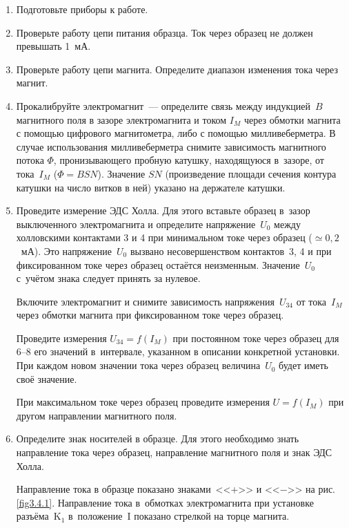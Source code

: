 \begin{enumerate}
\item{ Подготовьте приборы к работе.}

\item{ Проверьте работу цепи питания образца. Ток через образец не должен превышать 1~мА.}

\item{ Проверьте работу цепи магнита. Определите диапазон изменения тока через магнит.}

\item{ Прокалибруйте электромагнит~--- определите связь между индукцией~$B$ магнитного поля в зазоре электромагнита и током $I_M$ через обмотки магнита с помощью цифрового магнитометра, либо с помощью милливеберметра. В случае использования милливеберметра снимите зависимость магнитного потока $\Phi$, пронизывающего пробную катушку, находящуюся в~зазоре, от тока~$I_M$ ($\Phi=BSN$). Значение $SN$ (произведение площади сечения контура катушки на число витков в ней) указано на держателе катушки.}

\item{ Проведите измерение ЭДС Холла. Для этого вставьте образец в~зазор выключенного электромагнита и определите напряжение~$U_0$ между холловскими контактами 3 и 4 при минимальном токе через образец ($\simeq 0,2$~мА). Это напряжение~$U_0$ вызвано несовершенством контактов~3, 4 и при фиксированном токе через образец остаётся неизменным. Значение~$U_0$ с~учётом знака следует принять за нулевое.

Включите электромагнит и снимите зависимость напряжения~$U_{34}$ от тока~$I_M$ через обмотки магнита при фиксированном токе через образец.

Проведите измерения $U_{34}=f(I_{M})$ при постоянном токе через образец для 6--8 его значений в~интервале, указанном в описании конкретной установки. При каждом новом значении тока через образец величина~$U_0$ будет иметь своё значение.

При максимальном токе через образец проведите измерения $U=f(I_{M})$ при другом направлении магнитного поля.
}
\item{ Определите знак носителей в образце. Для этого необходимо знать направление тока через образец, направление магнитного поля и знак ЭДС Холла.

Направление тока в образце показано знаками~<<+>> и <<$-$>> на рис. \ref{fig3.4.1}. Направление тока в~обмотках электромагнита при установке разъёма~K$_1$ в~положение~I показано стрелкой на торце магнита.

}
\end{enumerate}
